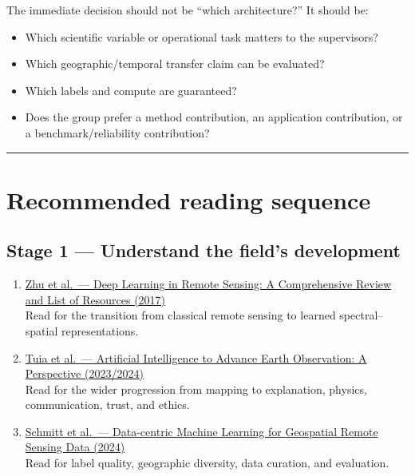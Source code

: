 \documentclass[
  a4paper,
  11pt]{article}
\providecommand{\tightlist}{%
  \setlength{\itemsep}{0pt}\setlength{\parskip}{0pt}}
\begin{document}
The immediate decision should not be ``which architecture?'' It should
be:

\begin{itemize}
\tightlist
\item
  Which scientific variable or operational task matters to the
  supervisors?
\item
  Which geographic/temporal transfer claim can be evaluated?
\item
  Which labels and compute are guaranteed?
\item
  Does the group prefer a method contribution, an application
  contribution, or a benchmark/reliability contribution?
\end{itemize}

\begin{center}\rule{0.5\linewidth}{0.5pt}\end{center}

\hypertarget{recommended-reading-sequence}{%
\section{Recommended reading
sequence}\label{recommended-reading-sequence}}

\hypertarget{stage-1-understand-the-fields-development}{%
\subsection{Stage 1 --- Understand the field's
development}\label{stage-1-understand-the-fields-development}}

\begin{enumerate}
\def\labelenumi{\arabic{enumi}.}
\item
  \href{https://arxiv.org/abs/1710.03959}{Zhu et al.~--- Deep Learning
  in Remote Sensing: A Comprehensive Review and List of Resources
  (2017)}\\
  Read for the transition from classical remote sensing to learned
  spectral--spatial representations.
\item
  \href{https://arxiv.org/html/2305.08413v2}{Tuia et al.~--- Artificial
  Intelligence to Advance Earth Observation: A Perspective
  (2023/2024)}\\
  Read for the wider progression from mapping to explanation, physics,
  communication, trust, and ethics.
\item
  \href{https://arxiv.org/html/2312.05327v3}{Schmitt et al.~---
  Data-centric Machine Learning for Geospatial Remote Sensing Data
  (2024)}\\
  Read for label quality, geographic diversity, data curation, and
  evaluation.
\end{enumerate}
\end{document}
